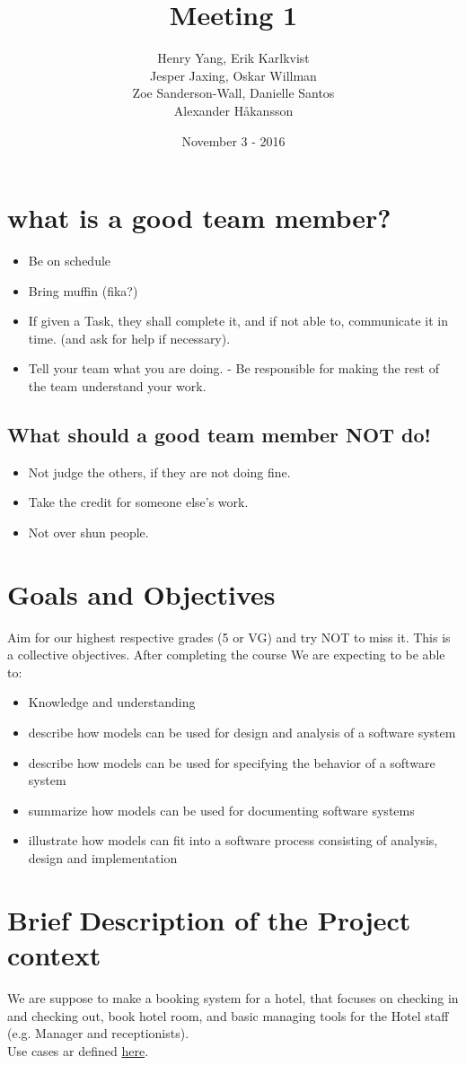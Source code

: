 \documentclass[utf8]{article}
\title{Meeting 1}
\author{Henry Yang, Erik Karlkvist \\Jesper Jaxing, Oskar Willman\\ Zoe Sanderson-Wall, Danielle Santos\\Alexander Håkansson}
\date{November 3 - 2016}
\begin{document}
	\maketitle
	\section{what is a good team member?}
	\begin{itemize}
		\item Be on schedule
		\item Bring muffin (fika?)
		\item If given a Task, they shall complete it, and if not able to, communicate it in time. (and ask for help if necessary).
		\item Tell your team what you are doing. - Be responsible for making the rest of the team understand your work.
	\end{itemize}
	\subsection{What should a good team member NOT do!}
	\begin{itemize}
		\item Not judge the others, if they are not doing fine.
		\item Take the credit for someone else's work.
		\item Not over shun people.
	\end{itemize}
	\section{Goals and Objectives}
	Aim for our highest respective grades (5 or VG) and try NOT to miss it. This is a collective objectives.
	After completing the course We are expecting to be able to:
	\begin{itemize}
		\item Knowledge and understanding
		\item describe how models can be used for design and analysis of a software system
		\item describe how models can be used for specifying the behavior of a software system
		\item summarize how models can be used for documenting software systems
		\item illustrate how models can fit into a software process consisting of analysis, design and implementation
	\end{itemize}
	\section{Brief Description of the Project context}
	We are suppose to make a booking system for a hotel, that focuses on checking in and checking out, book hotel room, and basic managing tools for the Hotel staff (e.g. Manager and receptionists).
	\\Use cases ar defined \href{https://pingpong.chalmers.se/courseId/7502/node.do?id=3369884}{here}.
	
\end{document}
